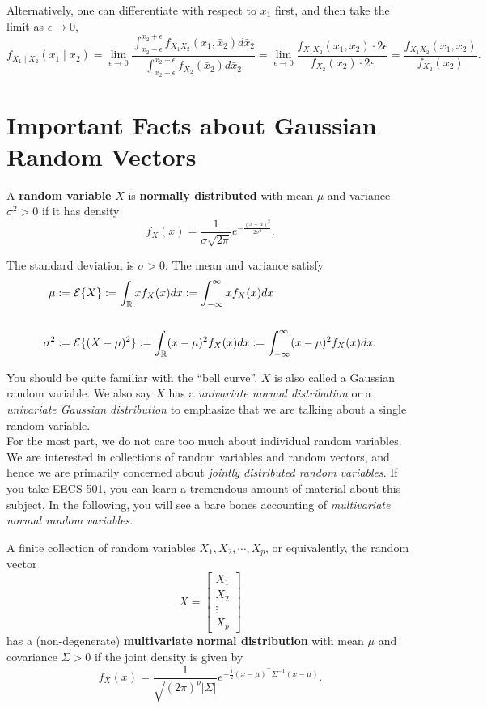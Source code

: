 Alternatively, one can differentiate with respect to $x_1$ first, and then take the limit as $\epsilon \to 0$,
        $$f_{X_1 \mid X_2}(x_1\mid x_2)
        =\lim_{\epsilon \to 0} \frac{\int^{x_2+\epsilon}_{x_2-\epsilon}f_{X_1X_2}(x_1,\bar{x}_2)d\bar{x}_2}
        {\int^{x_2+\epsilon}_{x_2-\epsilon}f_{X_2}(\bar{x}_2)d\bar{x}_2}
        =\lim_{\epsilon \to 0} \frac{f_{X_1X_2}(x_1,x_2)\cdot 2\epsilon}{f_{X_2}(x_2)\cdot 2\epsilon}
        =\frac{f_{X_1X_2}(x_1,x_2)}{f_{X_2}(x_2)}.$$
        
        
\section{Important Facts about Gaussian Random Vectors}

\begin{definition} A \textbf{random variable} $X$ is \textbf{normally distributed} with mean $\mu$ and variance $\sigma^2 >0$ if it has density
$$ f_X(x) = \frac{1}{\sigma \sqrt{2 \pi}} e^{-\frac{(x-\mu)^2}{2 \sigma^2}}.$$

The standard deviation is $\sigma>0$. The mean and variance satisfy
\begin{align*} \mu &:= \mathcal{E}\{ X\} := \int_{\mathbb R} x f_X(x) dx := \int_{-\infty}^{\infty} x f_X(x) dx \\
\\
\sigma^2&:= \mathcal{E}\{ (X-\mu)^2 \} := \int_{\mathbb R} (x-\mu)^2 f_X(x) dx := \int_{-\infty}^{\infty} (x-\mu)^2 f_X(x) dx.
\end{align*}

\end{definition}

You should be quite familiar with the  ``bell curve''. $X$ is also called a Gaussian random variable.  We also say $X$ has a \textit{univariate normal distribution} or a \textit{univariate Gaussian distribution} to emphasize that we are talking about a single random variable.\\

For the most part, we do not care too much about individual random variables. We are interested in collections of random variables and random vectors, and hence we are primarily concerned about \textit{jointly distributed random variables}. If you take EECS 501, you can learn a tremendous amount of material about this subject. In the following, you will see a bare bones accounting of \textit{multivariate normal random variables}. 

\begin{definition} A finite collection of random variables $X_1, X_2, \cdots, X_p$, or equivalently, the random vector
 $$ X = \begin{bmatrix} X_1 \\ X_2 \\ \vdots \\ X_p  \end{bmatrix}$$
 has a (non-degenerate) \textbf{multivariate normal distribution} with mean $\mu$ and covariance $\Sigma>0$ if the joint density is given by
$$f_X(x) = \frac{1}{\sqrt{(2 \pi)^{p} |\Sigma| }} e^{ -\frac{1}{2} (x-\mu)^\top \Sigma^{-1}(x-\mu) }.$$

\end{definition}

